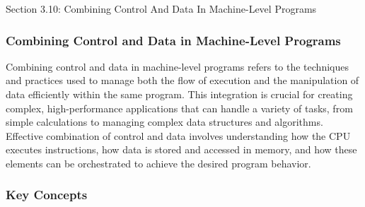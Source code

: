 \begin{notes}{Section 3.10: Combining Control And Data In Machine-Level Programs}
    \subsubsection*{Combining Control and Data in Machine-Level Programs}

    Combining control and data in machine-level programs refers to the techniques and practices used to manage both the flow of execution and the manipulation of data efficiently within the same program. 
    This integration is crucial for creating complex, high-performance applications that can handle a variety of tasks, from simple calculations to managing complex data structures and algorithms. 
    Effective combination of control and data involves understanding how the CPU executes instructions, how data is stored and accessed in memory, and how these elements can be orchestrated to achieve 
    the desired program behavior. \vspace*{1em}
    
    \subsubsection*{Key Concepts}
    

\end{notes}
